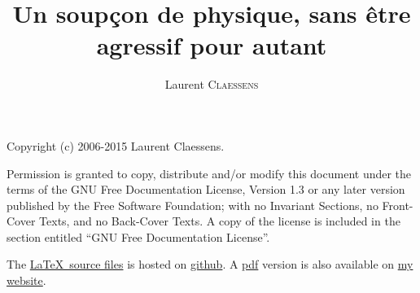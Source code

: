 
\thispagestyle{empty}
\title{Un soupçon de physique, sans être agressif pour autant}
\author{Laurent \textsc{Claessens}}
\maketitle

Copyright (c) 2006-2015  Laurent Claessens.

Permission is granted to copy, distribute and/or modify this document under the terms of the GNU Free Documentation License, Version 1.3 or any later version published by the Free Software Foundation; with no Invariant Sections, no Front-Cover Texts, and no Back-Cover Texts. A copy of the license is included in the section entitled ``GNU Free Documentation License''.

The \href{https://github.com/LaurentClaessens/echa}{\LaTeX\ source files} is hosted on \href{http://fr.wikipedia.org/wiki/Github}{github}. A \href{http://student.ulb.ac.be/~lclaesse/echa.pdf}{pdf} version is also available on \href{http://student.ulb.ac.be/~lclaesse/}{my website}.


\vfill

\normalsize
